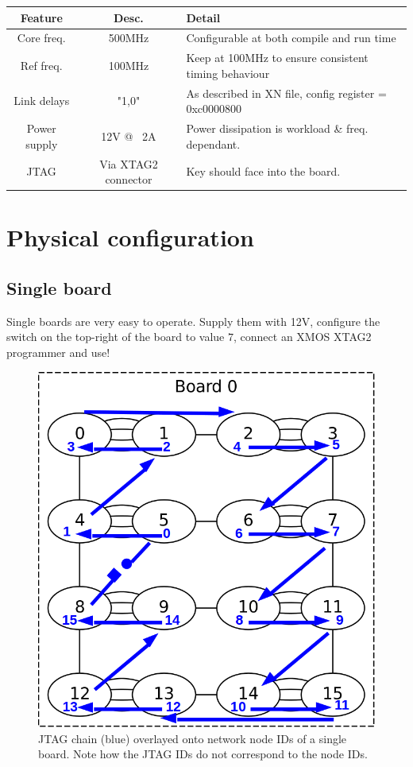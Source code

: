 \documentclass[12pt,a4paper,final,twoside]{article}
\begin{document}
\begin{tabular}{|c|c|p{2.5in}|}
\hline 
\textbf{Feature} & \textbf{Desc.} & \textbf{Detail} \\ 
\hline 
Core freq. & 500MHz & Configurable at both compile and run time \\ 
\hline 
Ref freq. & 100MHz & Keep at 100MHz to ensure consistent timing behaviour \\ 
\hline 
Link delays & "1,0" & As described in XN file, config register = 0xc0000800 \\ 
\hline 
Power supply & 12V @ ~2A & Power dissipation is workload \& freq. dependant. \\ 
\hline
JTAG & Via XTAG2 connector & Key should face into the board. \\
\hline 
\end{tabular}

\section{Physical configuration}

\subsection{Single board}

Single boards are very easy to operate. Supply them with 12V, configure the switch on the top-right of the board to value $7$, connect an XMOS XTAG2 programmer and use!

\begin{figure}[htbp]
\centering
\includegraphics[scale=0.5]{jtag-single.png}
\caption{JTAG chain (blue) overlayed onto network node IDs of a single board. Note how the JTAG IDs do not correspond to the node IDs.}
\end{figure}
\end{document}
